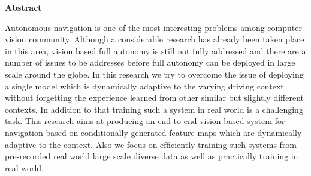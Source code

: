 \begin{flushleft}
	\large
	\textbf{Abstract}
\end{flushleft}

Autonomous navigation is one of the most interesting problems among computer vision community. Although a considerable research has already been taken place in this area, vision based full autonomy is still not fully addressed and there are a number of issues to be addresses before full autonomy can be deployed in large scale around the globe. In this research we try to overcome the issue of deploying a single model which is dynamically adaptive to the varying driving context without forgetting the experience learned from other similar but slightly different contexts. In addition to that training such a system in real world is a challenging task. This research aims at producing an end-to-end vision based system for navigation based on conditionally generated feature maps which are dynamically adaptive to the context. Also we focus on efficiently training such systems from pre-recorded real world large scale diverse data as well as practically training in real world.



